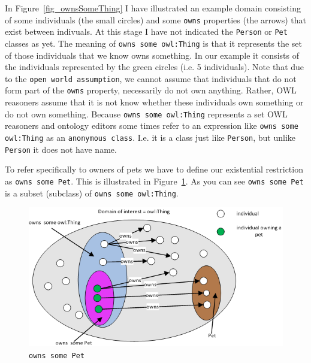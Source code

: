\documentclass{amsart}
\begin{document}
  In Figure~\ref{fig_ownsSomeThing} I have illustrated an example domain consisting of some individuals (the small circles) and some \texttt{owns} properties (the arrows) that exist between indivuals. At this stage I have not indicated the \texttt{Person} or \texttt{Pet} classes as yet. The meaning of \texttt{owns some owl:Thing} is that it represents the set of those individuals that we know owns something. In our example it consists of the individuals represented by the green circles (i.e. 5 individuals). Note that due to the \texttt{open world assumption}, we cannot assume that individuals that do not form part of the \texttt{owns} property, necessarily do not own anything. Rather, OWL reasoners assume that it is not know whether these individuals own something or do not own something. Because \texttt{owns some owl:Thing} represents a set OWL reasoners and ontology editors some times refer to an expression like \texttt{owns some owl:Thing} as an \texttt{anonymous class}. I.e. it is a class just like \texttt{Person}, but unlike \texttt{Person} it does not have name.
  
  
  To refer specifically to owners of pets we have to define our existential restriction as \texttt{owns some Pet}. This is illustrated in Figure~\ref{fig_ownsSomePet}. As you can see \texttt{owns some Pet} is a subset (subclass) of \texttt{owns some owl:Thing}. 
  
    \begin{figure}
      \centering \includegraphics[trim = 0mm 0mm 0mm 0mm, clip, scale=1]{./ownsSomePet.png}
      \caption{\texttt{owns some Pet}}\label{fig_ownsSomePet}
    \end{figure}    
  
\end{document}
